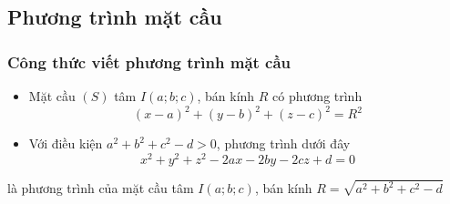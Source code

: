 \subsection{Phương trình mặt cầu}
\begin{minipage}[h]{0.7\textwidth}
	\subsubsection{Công thức viết phương trình mặt cầu}
	\begin{itemize}\vspace{-0.2cm}
		\item Mặt cầu $(S)$ tâm $I(a;b;c)$, bán kính $R$ có phương trình\\\vspace{-0.2cm}
		$$(x-a)^2+(y-b)^2+(z-c)^2=R^2$$\vspace{-0.8cm}
		\item Với điều kiện $a^2+b^2+c^2-d>0$, phương trình dưới đây\vspace{-0.1cm}
		$$x^2+y^2+z^2-2ax-2by-2cz+d=0$$\vspace{-0.6cm}
	\end{itemize}
\end{minipage} \hspace{0.8cm}
\begin{minipage}[h]{0.25\textwidth}
\end{minipage} \vspace{0.3cm}
\centerline{là phương trình của mặt cầu tâm $I(a;b;c)$, bán kính $R=\sqrt{a^2+b^2+c^2-d}$} \vspace{-0.8cm}
